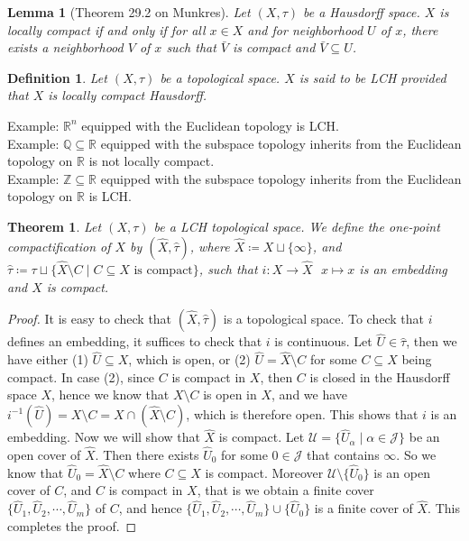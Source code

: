 \documentclass[11pt]{book}
\theoremstyle{break}
\theoremstyle{break}
\newtheorem{thm}{Theorem}[section]
\newtheorem{lem}{Lemma}[thm]
\newtheorem{defn}{Definition}[corL]
\newcommand{\R}{\mathbb{R}}
\newcommand{\Z}{\mathbb{Z}}
\newcommand{\Q}{\mathbb{Q}}
\newcommand{\example}{\color{green}Example: \color{black}}
\begin{document}
\begin{lem}[Theorem 29.2 on Munkres]
Let $(X,\tau)$ be a Hausdorff space. $X$ is locally compact if and only if for all $x \in X$ and for neighborhood $U$ of $x$, there exists a neighborhood $V$ of $x$ such that $\bar{V}$ is compact and $\bar{V}\subseteq U$. 
\end{lem}


\begin{defn}
Let $(X,\tau)$ be a topological space. $X$ is said to be LCH provided that $X$ is locally compact Hausdorff. 
\end{defn}

\example $\R^n$ equipped with the Euclidean topology is LCH.\\

\example $\Q\subseteq \R$ equipped with the subspace topology inherits from the Euclidean topology on $\R$ is not locally compact.\\

\example $\Z\subseteq \R$ equipped with the subspace topology inherits from the Euclidean topology on $\R$ is LCH.\\

\begin{thm}
Let $(X,\tau)$ be a LCH topological space. We define the one-point compactification of $X$ by $(\hat{X},\hat{\tau})$, where $\hat{X}\coloneqq X\sqcup \{\infty\} $, and $\hat{\tau} \coloneqq \tau \sqcup\{\hat{X}\setminus C \mid C\subseteq X \text{ is compact}\}$, such that $i:X \to \hat{X} \ \ \ x\mapsto x$ is an embedding and $\hat{X}$ is compact.
\end{thm}
\begin{proof}
It is easy to check that $(\hat{X},\hat{\tau})$ is a topological space. To check that $i$ defines an embedding, it suffices to check that $i$ is continuous. Let $\hat{U}\in \hat{\tau}$, then we have either (1) $\hat{U} \subseteq X$, which is open, or (2) $\hat{U} = \hat{X}\setminus C$ for some $C \subseteq X$ being compact. In case (2), since $C$ is compact in $X$, then $C$ is closed in the Hausdorff space $X$, hence we know that $X\setminus C$ is open in $X$, and we have $i^{-1}(\hat{U}) =  X\setminus C = X\cap (\hat{X}\setminus C)$, which is therefore open. This shows that $i$ is an embedding. Now we will show that $\hat{X}$ is compact. Let $\mathcal{U} = \{\hat{U}_\alpha\mid \alpha \in \mathcal{J}\}$ be an open cover of $\hat{X}$. Then there exists $\hat{U}_0$ for some $0 \in\mathcal{J}$ that contains $\infty$. So we know that $\hat{U}_0 = \hat{X} \setminus C$ where $C \subseteq X$ is compact. Moreover $\mathcal{U}\setminus \{\hat{U}_0\}$ is an open cover of $C$, and $C$ is compact in $X$, that is  we obtain a finite cover $\{\hat{U}_1,\hat{U}_2,\cdots, \hat{U}_m\}$ of $C$, and hence $\{\hat{U}_1,\hat{U}_2,\cdots, \hat{U}_m\} \cup \{\hat{U}_0\}$ is a finite cover of $\hat{X}$. This completes the proof. 
\end{proof}
\end{document}

